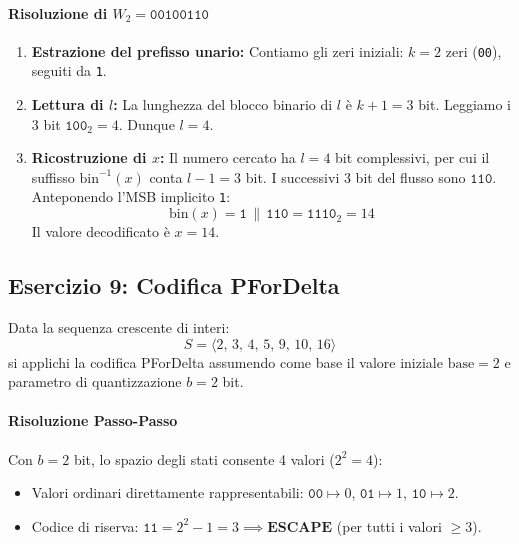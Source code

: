 \paragraph{Risoluzione di $W_2 = \texttt{00100110}$}
\begin{enumerate}
  \item \textbf{Estrazione del prefisso unario:} Contiamo gli zeri iniziali: $k = 2$ zeri (\texttt{00}), seguiti da \texttt{1}.
  \item \textbf{Lettura di $l$:} La lunghezza del blocco binario di $l$ \`e $k + 1 = 3$ bit. Leggiamo i 3 bit $\texttt{100}_2 = 4$. Dunque $l = 4$.
  \item \textbf{Ricostruzione di $x$:} Il numero cercato ha $l = 4$ bit complessivi, per cui il suffisso $\text{bin}^{-1}(x)$ conta $l - 1 = 3$ bit. I successivi 3 bit del flusso sono $\texttt{110}$. Anteponendo l'MSB implicito \texttt{1}:
  \begin{equation*}
    \text{bin}(x) = \texttt{1} \,\|\, \texttt{110} = \texttt{1110}_2 = 14
  \end{equation*}
  Il valore decodificato \`e $x = 14$.
\end{enumerate}

\FloatBarrier
\subsection{Esercizio 9: Codifica PForDelta}
\label{subsec:es9-pfordelta}

\begin{example}[Compressione a Blocchi PForDelta con $b = 2$]
Data la sequenza crescente di interi:
\begin{equation}
  S = \langle 2, \, 3, \, 4, \, 5, \, 9, \, 10, \, 16 \rangle
\end{equation}
si applichi la codifica PForDelta assumendo come base il valore iniziale $\text{base} = 2$ e parametro di quantizzazione $b = 2$ bit.
\end{example}

\paragraph{Risoluzione Passo-Passo}
Con $b = 2$ bit, lo spazio degli stati consente 4 valori ($2^2 = 4$):
\begin{itemize}
  \item Valori ordinari direttamente rappresentabili: $\texttt{00} \mapsto 0$, $\texttt{01} \mapsto 1$, $\texttt{10} \mapsto 2$.
  \item Codice di riserva: $\texttt{11} = 2^2 - 1 = 3 \implies \mathbf{ESCAPE}$ (per tutti i valori $\ge 3$).
\end{itemize}

